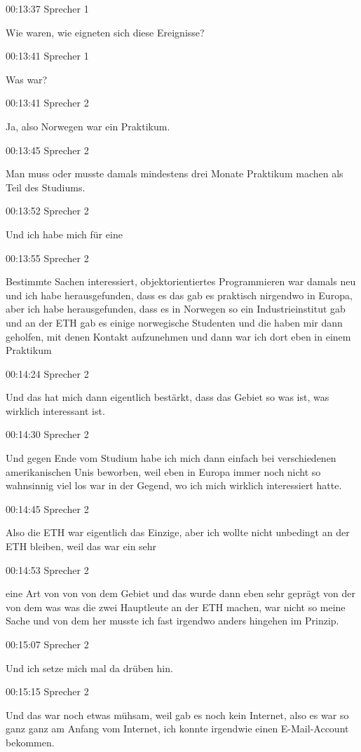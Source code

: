 00:13:37 Sprecher 1

Wie waren, wie eigneten sich diese Ereignisse?

00:13:41 Sprecher 1

Was war?

00:13:41 Sprecher 2

Ja, also Norwegen war ein Praktikum.

00:13:45 Sprecher 2

Man muss oder musste damals mindestens drei Monate Praktikum machen als
Teil des Studiums.

00:13:52 Sprecher 2

Und ich habe mich für eine

00:13:55 Sprecher 2

Bestimmte Sachen interessiert, objektorientiertes Programmieren war
damals neu und ich habe herausgefunden, dass es das gab es praktisch
nirgendwo in Europa, aber ich habe herausgefunden, dass es in Norwegen
so ein Industrieinstitut gab und an der ETH gab es einige norwegische
Studenten und die haben mir dann geholfen, mit denen Kontakt aufzunehmen
und dann war ich dort eben in einem Praktikum

00:14:24 Sprecher 2

Und das hat mich dann eigentlich bestärkt, dass das Gebiet so was ist,
was wirklich interessant ist.

00:14:30 Sprecher 2

Und gegen Ende vom Studium habe ich mich dann einfach bei verschiedenen
amerikanischen Unis beworben, weil eben in Europa immer noch nicht so
wahnsinnig viel los war in der Gegend, wo ich mich wirklich interessiert
hatte.

00:14:45 Sprecher 2

Also die ETH war eigentlich das Einzige, aber ich wollte nicht unbedingt
an der ETH bleiben, weil das war ein sehr

00:14:53 Sprecher 2

eine Art von von von dem Gebiet und das wurde dann eben sehr geprägt von
der von dem was was die zwei Hauptleute an der ETH machen, war nicht so
meine Sache und von dem her musste ich fast irgendwo anders hingehen im
Prinzip.

00:15:07 Sprecher 2

Und ich setze mich mal da drüben hin.

00:15:15 Sprecher 2

Und das war noch etwas mühsam, weil gab es noch kein Internet, also es
war so ganz ganz am Anfang vom Internet, ich konnte irgendwie einen
E-Mail-Account bekommen.


